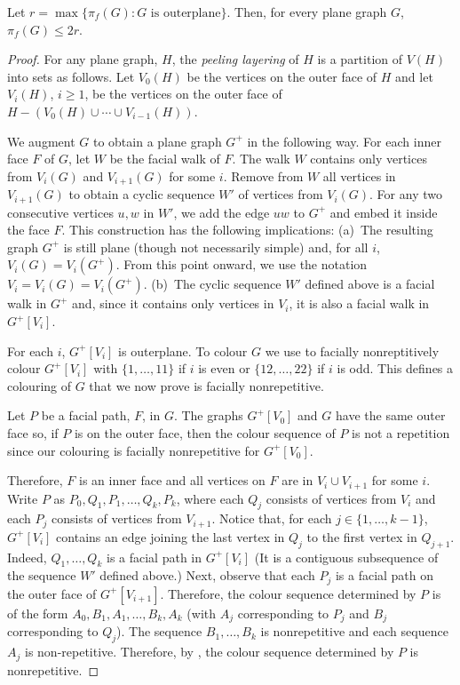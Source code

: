 \documentclass{patmorin}
\begin{document}
\begin{thm}
   Let $r=\max\{\pi_f(G):\text{$G$ is outerplane}\}$.  Then, for every
   plane graph $G$, $\pi_f(G)\le 2r$.
\end{thm}

\begin{proof}
   For any plane graph, $H$, the \emph{peeling layering} of $H$ is
   a partition of $V(H)$ into sets as follows.  Let $V_0(H)$ be the
   vertices on the outer face of $H$ and let $V_i(H)$, $i\ge 1$, be the
   vertices on the outer face of $H-(V_0(H)\cup\cdots\cup V_{i-1}(H))$.

   We augment $G$ to obtain a plane graph $G^+$ in the following way.
   For each inner face $F$ of $G$, let $W$ be the facial walk of $F$.
   The walk $W$ contains only vertices from $V_i(G)$ and $V_{i+1}(G)$
   for some $i$.  Remove from $W$ all vertices in $V_{i+1}(G)$ to
   obtain a cyclic sequence $W'$ of vertices from $V_i(G)$.  For any
   two consecutive vertices $u,w$ in $W'$, we add the edge $uw$
   to $G^+$ and embed it inside the face $F$. This construction has
   the following implications: (a)~The resulting graph $G^+$
   is still plane (though not necessarily simple) and, for all
   $i$, $V_i(G)=V_i(G^+)$. From this point onward, we use the notation
   $V_i=V_i(G)=V_i(G^+)$.
   (b)~The cyclic sequence $W'$ defined above is a facial walk
   in $G^+$ and, since it contains only vertices in $V_i$, it is also
   a facial walk in $G^+[V_i]$.

   For each $i$, $G^+[V_i]$ is outerplane.  To colour $G$ we use
    to facially nonreptitively colour $G^+[V_i]$ with
   $\{1,\ldots,11\}$ if $i$ is even or $\{12,\ldots,22\}$ if $i$ is odd.
   This defines a colouring of $G$ that we now prove is facially
   nonrepetitive.

   Let $P$ be a facial path, $F$, in $G$. The graphs $G^+[V_0]$ and $G$
   have the same outer face so, if $P$ is on the outer face,
   then the colour sequence of $P$ is not a repetition
   since our colouring is facially nonrepetitive for $G^+[V_0]$.

   Therefore, $F$ is an inner face and all vertices on $F$ are in $V_i\cup
   V_{i+1}$ for some $i$.  Write $P$ as $P_0,Q_1,P_1,\ldots,Q_k,P_k$,
   where each $Q_j$ consists of vertices from $V_i$ and each $P_j$
   consists of vertices from $V_{i+1}$.  Notice that, for each
   $j\in\{1,\ldots,k-1\}$, $G^+[V_i]$ contains an edge joining the
   last vertex in $Q_j$ to the first vertex in $Q_{j+1}$.  Indeed,
   $Q_{1},\ldots,Q_k$ is a facial path in $G^+[V_i]$ (It is a contiguous
   subsequence of the sequence $W'$ defined above.)  Next, observe that
   each $P_j$ is a facial path on the outer face of $G^+[V_{i+1}]$.
   Therefore, the colour sequence determined by $P$ is of the form
   $A_0,B_1,A_1,\ldots,B_k,A_k$ (with $A_j$ corresponding to $P_j$
   and $B_j$ corresponding to $Q_j$).  The sequence $B_1,\ldots,B_k$ is
   nonrepetitive and each sequence $A_j$ is non-repetitive.  Therefore,
   by , the colour sequence determined by $P$
   is nonrepetitive.
\end{proof}
\end{document}
